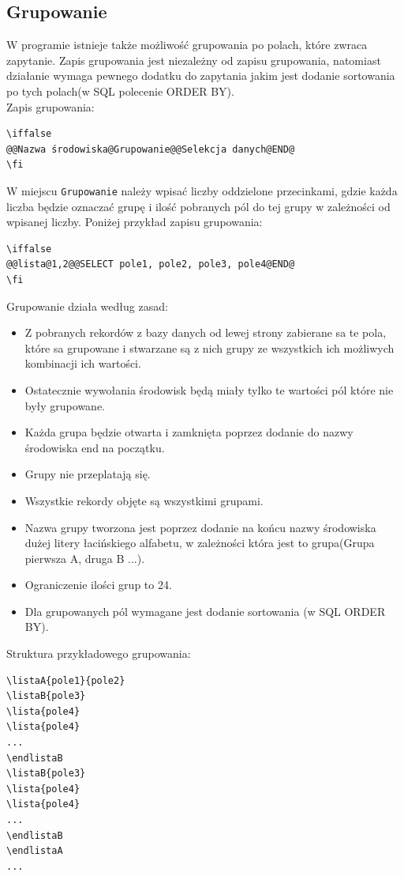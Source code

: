 \subsection{Grupowanie}
W programie istnieje także możliwość grupowania po polach, które zwraca zapytanie. Zapis grupowania jest niezależny od zapisu grupowania, natomiast działanie wymaga pewnego dodatku do zapytania jakim jest dodanie sortowania po tych polach(w SQL polecenie ORDER BY).\\
Zapis grupowania:
\begin{lstlisting}
\iffalse 
@@Nazwa środowiska@Grupowanie@@Selekcja danych@END@
\fi
\end{lstlisting}
W miejscu \texttt{Grupowanie} należy wpisać liczby oddzielone przecinkami, gdzie każda liczba będzie oznaczać grupę i ilość pobranych pól do tej grupy w zależności od wpisanej liczby. Poniżej przykład zapisu grupowania:
\begin{lstlisting}
\iffalse 
@@lista@1,2@@SELECT pole1, pole2, pole3, pole4@END@
\fi
\end{lstlisting}
\par 
Grupowanie działa według zasad:\\
\begin{itemize}
\item Z pobranych rekordów z bazy danych od lewej strony zabierane sa te pola, które sa grupowane i stwarzane są z nich grupy ze wszystkich ich możliwych kombinacji ich wartości. 
\item Ostatecznie wywołania środowisk będą miały tylko te wartości pól które nie były grupowane.
\item Każda grupa będzie otwarta i zamknięta poprzez dodanie do nazwy środowiska end na początku.
\item Grupy nie przeplatają się.
\item Wszystkie rekordy objęte są wszystkimi grupami.
\item Nazwa grupy tworzona jest poprzez dodanie na końcu nazwy środowiska dużej litery łacińskiego alfabetu, w zależności która jest to grupa(Grupa pierwsza A, druga B ...). 
\item Ograniczenie ilości grup to 24.
\item Dla grupowanych pól wymagane jest dodanie sortowania (w SQL ORDER BY).
\end{itemize}

Struktura przykładowego grupowania:
\begin{lstlisting}
\listaA{pole1}{pole2}
\listaB{pole3}
\lista{pole4}
\lista{pole4}
...
\endlistaB
\listaB{pole3}
\lista{pole4}
\lista{pole4}
...
\endlistaB
\endlistaA
...
\end{lstlisting}



